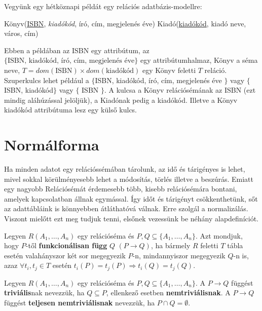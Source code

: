 \begin{pld}
Vegyünk egy hétköznapi példát egy relációs adatbázis-modellre:
\begin{center}
    Könyv(\underline{ISBN}, \textit{kiadókód}, író, cím, megjelenés éve) \break
    Kiadó(\underline{kiadókód}, kiadó neve, város, cím)
\end{center}
Ebben a példában az ISBN egy attribútum, az $\{\text{ISBN, kiadókód, író, cím, megjelenés éve} \}$ egy attribútumhalmaz, Könyv a séma neve, $T = dom(\text{ISBN}) \times dom(\text{kiadókód})$ egy Könyv feletti $T$ reláció.
Szuperkulcs lehet például a $\{$ISBN, kiadókód, író, cím, megjelenés éve $\}$ vagy $\{$ISBN, kiadókód$\}$ vagy $\{$ ISBN $\}$. A kulcsa a Könyv relációsémának az ISBN (ezt mindig aláhúzással jelöljük), a Kiadónak pedig a kiadókód. Illetve a Könyv kiadókód attribútuma lesz egy külső kulcs.
\end{pld}

\section{Normálforma}

Ha minden adatot egy relációssémában tárolunk, az idő és tárigényes is lehet, mivel sokkal körülményesebb lehet a módosítás, törlés illetve a beszúrás. Emiatt egy nagyobb Relációsémát érdemesebb több, kisebb relációsémára bontani, amelyek kapcsolatban állnak egymással. Így időt és tárigényt csökkenthetünk, sőt az adattábláink is könnyebben átláthatóvá válnak. Erre szolgál a normalizálás. Viszont mielőtt ezt meg tudjuk tenni, elsőnek vezessünk be néhány alapdefiníciót.

\begin{defi} 
Legyen $R(A_1,\ldots,A_n)$ egy relációséma és $P,Q \subseteq \{A_1,\ldots,A_n\}$. Azt mondjuk, hogy $P$-től \textbf{funkcionálisan függ} $Q$ $(P \rightarrow Q)$, ha bármely $R$ feletti $T$ tábla esetén valahányszor két sor megegyezik $P$-n, mindannyiszor megegyezik $Q$-n is, azaz 
$\forall t_i, t_j \in T$ esetén $ t_i(P) = t_j(P) \Rightarrow t_i(Q) = t_j(Q)$. 
\end{defi}

\begin{defi}
Legyen $R(A_1,\ldots,A_n)$ egy relációséma és $P,Q \subseteq \{A_1,\ldots,A_n\}$. A $P \longrightarrow Q$ függést \textbf{triviális}nak nevezzük, ha $Q \subseteq P$, ellenkező esetben \textbf{nemtriviálisnak}. A $P \longrightarrow Q$ függést \textbf{teljesen nemtriviálisnak} nevezzük, ha $P \cap Q = \emptyset$.
\end{defi}

